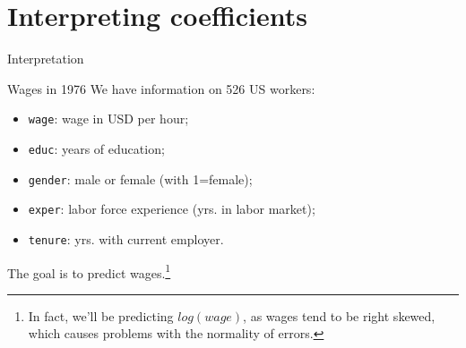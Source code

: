 \documentclass[12pt,english,pdf,xcolor=dvipsnames,aspectratio=169,handout]{beamer}\usepackage[]{graphicx}\usepackage[]{xcolor}
\begin{document}
\section{Interpreting coefficients}


\begin{frame}
\begin{center}
    \Huge Interpretation
\end{center}
\end{frame}


\begin{frame}{Wages in 1976}
We have information on 526 US workers:

\begin{itemize}
\item \texttt{wage}: wage in USD per hour;
\item \texttt{educ}: years of education;
\item \texttt{gender}: male or female (with 1=female);
\item \texttt{exper}: labor force experience (yrs. in labor market);
\item \texttt{tenure}: yrs. with current employer.
\end{itemize}

The goal is to predict wages.\footnote{In fact, we'll be predicting $log(wage)$, as wages tend to be right skewed, which causes problems with the normality of errors.}

\end{frame}
\end{document}
